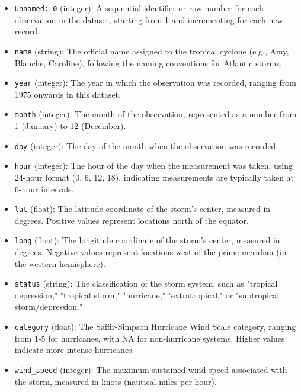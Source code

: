 \begin{itemize}
	\item \texttt{Unnamed: 0} (integer): A sequential identifier or row number for each observation in the dataset, starting from 1 and incrementing for each new record.
	
	\item \texttt{name} (string): The official name assigned to the tropical cyclone (e.g., Amy, Blanche, Caroline), following the naming conventions for Atlantic storms.
	
	\item \texttt{year} (integer): The year in which the observation was recorded, ranging from 1975 onwards in this dataset.
	
	\item \texttt{month} (integer): The month of the observation, represented as a number from 1 (January) to 12 (December).
	
	\item \texttt{day} (integer): The day of the month when the observation was recorded.
	
	\item \texttt{hour} (integer): The hour of the day when the measurement was taken, using 24-hour format (0, 6, 12, 18), indicating measurements are typically taken at 6-hour intervals.
	
	\item \texttt{lat} (float): The latitude coordinate of the storm's center, measured in degrees. Positive values represent locations north of the equator.
	
	\item \texttt{long} (float): The longitude coordinate of the storm's center, measured in degrees. Negative values represent locations west of the prime meridian (in the western hemisphere).
	
	\item \texttt{status} (string): The classification of the storm system, such as "tropical depression," "tropical storm," "hurricane," "extratropical," or "subtropical storm/depression."
	
	\item \texttt{category} (float): The Saffir-Simpson Hurricane Wind Scale category, ranging from 1-5 for hurricanes, with NA for non-hurricane systems. Higher values indicate more intense hurricanes.
	
	\item \texttt{wind\_speed} (integer): The maximum sustained wind speed associated with the storm, measured in knots (nautical miles per hour).
	

\end{itemize}
